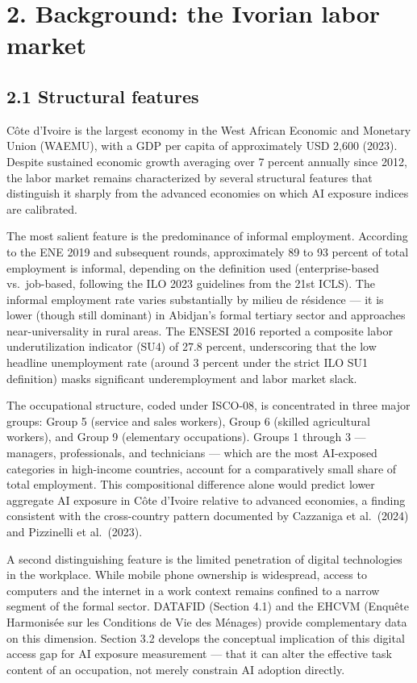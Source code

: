 \documentclass[
  11pt,
]{article}
\begin{document}
\section{2. Background: the Ivorian labor
market}\label{background-the-ivorian-labor-market}

\subsection{2.1 Structural features}\label{structural-features}

Côte d'Ivoire is the largest economy in the West African Economic and
Monetary Union (WAEMU), with a GDP per capita of approximately USD 2,600
(2023). Despite sustained economic growth averaging over 7 percent
annually since 2012, the labor market remains characterized by several
structural features that distinguish it sharply from the advanced
economies on which AI exposure indices are calibrated.

The most salient feature is the predominance of informal employment.
According to the ENE 2019 and subsequent rounds, approximately 89 to 93
percent of total employment is informal, depending on the definition
used (enterprise-based vs.~job-based, following the ILO 2023 guidelines
from the 21st ICLS). The informal employment rate varies substantially
by milieu de résidence --- it is lower (though still dominant) in
Abidjan's formal tertiary sector and approaches near-universality in
rural areas. The ENSESI 2016 reported a composite labor underutilization
indicator (SU4) of 27.8 percent, underscoring that the low headline
unemployment rate (around 3 percent under the strict ILO SU1 definition)
masks significant underemployment and labor market slack.

The occupational structure, coded under ISCO-08, is concentrated in
three major groups: Group 5 (service and sales workers), Group 6
(skilled agricultural workers), and Group 9 (elementary occupations).
Groups 1 through 3 --- managers, professionals, and technicians ---
which are the most AI-exposed categories in high-income countries,
account for a comparatively small share of total employment. This
compositional difference alone would predict lower aggregate AI exposure
in Côte d'Ivoire relative to advanced economies, a finding consistent
with the cross-country pattern documented by Cazzaniga et al.~(2024) and
Pizzinelli et al.~(2023).

A second distinguishing feature is the limited penetration of digital
technologies in the workplace. While mobile phone ownership is
widespread, access to computers and the internet in a work context
remains confined to a narrow segment of the formal sector. DATAFID
(Section 4.1) and the EHCVM (Enquête Harmonisée sur les Conditions de
Vie des Ménages) provide complementary data on this dimension. Section
3.2 develops the conceptual implication of this digital access gap for
AI exposure measurement --- that it can alter the effective task content
of an occupation, not merely constrain AI adoption directly.
\end{document}
